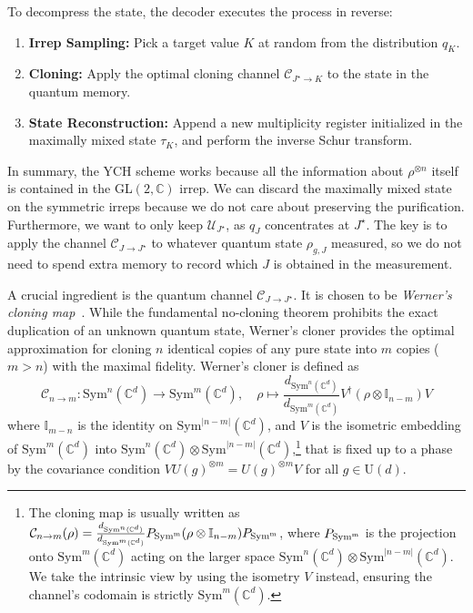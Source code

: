 \documentclass[a4paper,onecolumn,11pt]{quantumarticle}
\def\id{\mathbb{I}}
\def\C{\mathcal{C}}
\begin{document}
To decompress the state, the decoder executes the process in reverse:
\begin{enumerate}
    \item \textbf{Irrep Sampling:} Pick a target value $K$ at random from the distribution $q_K$.
    \item \textbf{Cloning:} Apply the optimal cloning channel $\mathcal{C}_{J^\star\to K}$ to the state in the quantum memory.
    \item \textbf{State Reconstruction:} Append a new multiplicity register initialized in the maximally mixed state $\tau_K$, and perform the inverse Schur transform.
\end{enumerate}

In summary, the YCH scheme works because all the information about $\rho^{\otimes n}$ itself is contained in the GL$(2,\mathbb C)$ irrep. We can discard the maximally mixed state on the symmetric irreps because we do not care about preserving the purification. Furthermore, we want to only keep $\mathcal U_{J^\star}$, as $q_J$ concentrates at $J^\star$. The key is to apply the channel $\C_{J\to J^\star}$ to whatever quantum state $\rho_{g,J}$ measured, so we do not need to spend extra memory to record which $J$ is obtained in the measurement.

A crucial ingredient is the quantum channel $\C_{J\to J^\star}$. It is chosen to be \emph{Werner's cloning map}~\cite{werner1998optimal}. While the fundamental no-cloning theorem prohibits the exact duplication of an unknown quantum state, Werner's cloner provides the optimal approximation for cloning $n$ identical copies of any pure state into $m$ copies ($m > n$) with the maximal fidelity. Werner's cloner is defined as
\begin{equation}\label{eq:werner}
    \mathcal{C}_{n \to m}:\mathrm{Sym}^n(\mathbb{C}^d)\to\mathrm{Sym}^m(\mathbb{C}^d),\quad \rho\mapsto \frac{d_{\mathrm{Sym}^n(\mathbb{C}^d)}}{d_{\mathrm{Sym}^m(\mathbb{C}^d)}}V^\dagger(\rho\otimes \id_{n-m})V
\end{equation}
where $\id_{m-n}$ is the identity on $\mathrm{Sym}^{|n-m|}(\mathbb{C}^d)$, and $V$ is the isometric embedding of $\mathrm{Sym}^m(\mathbb{C}^d)$ into $\mathrm{Sym}^n(\mathbb{C}^d)\otimes \mathrm{Sym}^{|n-m|}(\mathbb{C}^d)$,\footnote{The cloning map is usually written as $\mathcal{C}_{n \to m}(\rho) = \frac{d_{\mathrm{Sym}^n(\mathbb{C}^d)}}{d_{\mathrm{Sym}^m(\mathbb{C}^d)}}P_{\rm{Sym}^m}(\rho\otimes \id_{n-m})P_{\rm{Sym}^m}$, where $P_{\rm{Sym}^m}$ is the projection onto $\mathrm{Sym}^m(\mathbb{C}^d)$ acting on the larger space $\mathrm{Sym}^n(\mathbb{C}^d)\otimes \mathrm{Sym}^{|n-m|}(\mathbb{C}^d)$. We take the intrinsic view by using the isometry $V$ instead, ensuring the channel's codomain is strictly $\mathrm{Sym}^m(\mathbb{C}^d)$.} that is fixed up to a phase by the covariance condition $V U(g)^{\otimes m} = U(g)^{\otimes m}V$ for all $g \in \mathrm{U}(d)$.
\end{document}
